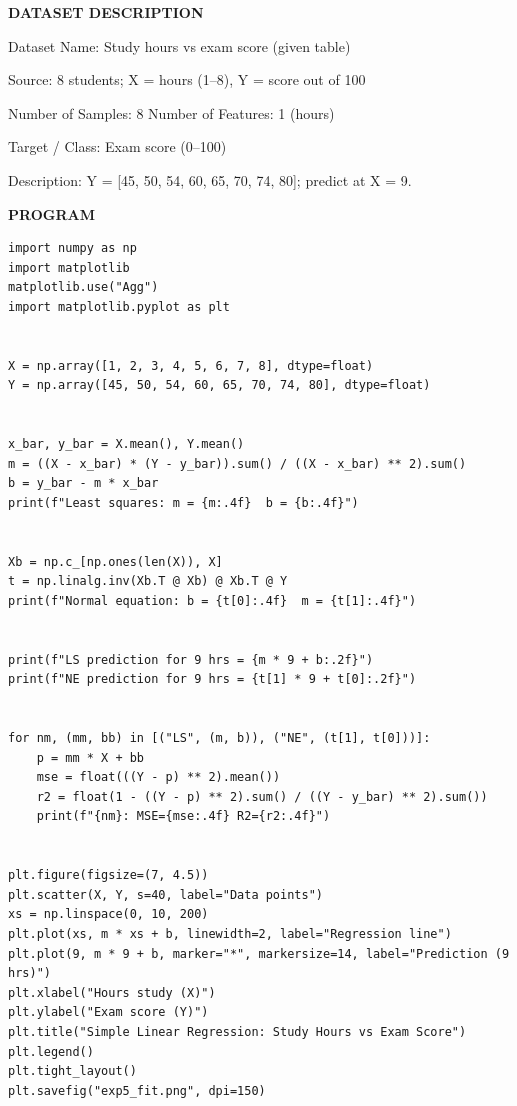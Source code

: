 \documentclass[11pt,twoside]{article}
\newcommand{\expheading}[1]{{\fontsize{14}{17}\selectfont\textbf{#1}\par}}
\begin{document}
{\expheading{DATASET DESCRIPTION}
\vspace{4pt}
\noindent Dataset Name: Study hours vs exam score (given table)\par
\noindent Source: 8 students; X = hours (1--8), Y = score out of 100\par
\noindent Number of Samples: 8 \hspace{0.3cm} Number of Features: 1 (hours)\par
\noindent Target / Class: Exam score (0--100)\par
\noindent Description: Y = [45, 50, 54, 60, 65, 70, 74, 80]; predict at X = 9. \par
\vspace{4pt}
} %

\newpage
\expheading{PROGRAM}
\vspace{6pt}

\begin{lstlisting}
import numpy as np
import matplotlib
matplotlib.use("Agg")
import matplotlib.pyplot as plt


X = np.array([1, 2, 3, 4, 5, 6, 7, 8], dtype=float)
Y = np.array([45, 50, 54, 60, 65, 70, 74, 80], dtype=float)


x_bar, y_bar = X.mean(), Y.mean()
m = ((X - x_bar) * (Y - y_bar)).sum() / ((X - x_bar) ** 2).sum()
b = y_bar - m * x_bar
print(f"Least squares: m = {m:.4f}  b = {b:.4f}")


Xb = np.c_[np.ones(len(X)), X]
t = np.linalg.inv(Xb.T @ Xb) @ Xb.T @ Y
print(f"Normal equation: b = {t[0]:.4f}  m = {t[1]:.4f}")


print(f"LS prediction for 9 hrs = {m * 9 + b:.2f}")
print(f"NE prediction for 9 hrs = {t[1] * 9 + t[0]:.2f}")


for nm, (mm, bb) in [("LS", (m, b)), ("NE", (t[1], t[0]))]:
    p = mm * X + bb
    mse = float(((Y - p) ** 2).mean())
    r2 = float(1 - ((Y - p) ** 2).sum() / ((Y - y_bar) ** 2).sum())
    print(f"{nm}: MSE={mse:.4f} R2={r2:.4f}")


plt.figure(figsize=(7, 4.5))
plt.scatter(X, Y, s=40, label="Data points")
xs = np.linspace(0, 10, 200)
plt.plot(xs, m * xs + b, linewidth=2, label="Regression line")
plt.plot(9, m * 9 + b, marker="*", markersize=14, label="Prediction (9 hrs)")
plt.xlabel("Hours study (X)")
plt.ylabel("Exam score (Y)")
plt.title("Simple Linear Regression: Study Hours vs Exam Score")
plt.legend()
plt.tight_layout()
plt.savefig("exp5_fit.png", dpi=150)
\end{lstlisting}
\end{document}

